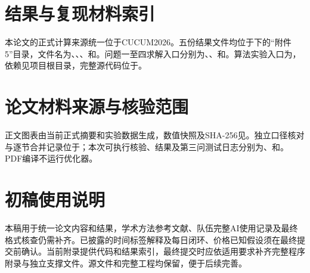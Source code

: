\documentclass[withoutpreface,bwprint]{cumcmthesis}
\begin{document}
\clearpage\begin{appendices}
\section{结果与复现材料索引}
本论文的正式计算来源统一位于CUCUM2026。五份结果文件均位于下的“附件5”目录，文件名为、、、和。问题一至四求解入口分别为、、和。算法实验入口为，依赖见项目根目录，完整源代码位于。

\section{论文材料来源与核验范围}
正文图表由当前正式摘要和实验数据生成，数值快照及SHA-256见。独立口径核对与逐节合并记录位于；本次可执行核验、结果及第三问测试日志分别为、和。PDF编译不运行优化器。

\section{初稿使用说明}
本稿用于统一论文内容和结果，学术方法参考文献、队伍完整AI使用记录及最终格式核查仍需补齐。已披露的时间标签解释及每日闭环、价格已知假设须在最终提交前确认。当前附录提供代码和结果索引，最终提交时应依适用要求补齐完整程序附录与独立支撑文件。源文件和完整工程均保留，便于后续完善。
\end{appendices}
\end{document}
